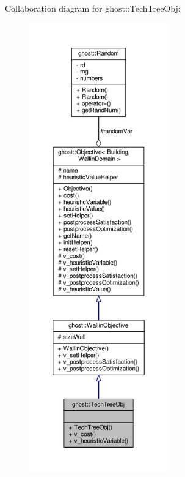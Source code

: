 Collaboration diagram for ghost\-:\-:Tech\-Tree\-Obj\-:
\nopagebreak
\begin{figure}[H]
\begin{center}
\leavevmode
\includegraphics[height=550pt]{classghost_1_1TechTreeObj__coll__graph}
\end{center}
\end{figure}
